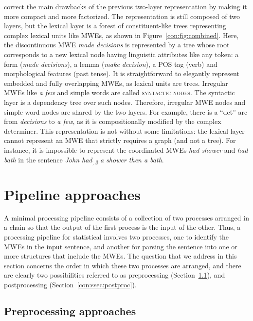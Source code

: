 \documentclass[output=paper]{langsci/langscibook}
\begin{document}
\citet{constantnivre16} correct the main drawbacks of the previous two-layer representation by making it more compact and more factorized. The representation is still composed of two layers, but the lexical layer is a forest of constituent-like trees representing complex lexical units like MWEs, as shown in Figure~\ref{con:fig:combined}.
Here, the discontinuous MWE \textit{made decisions} is represented by a tree whose root corresponds to a new lexical node having linguistic attributes like any token: a form (\textit{made decisions}), a lemma (\textit{make decision}), a POS tag (verb) and morphological features (past tense).
It is straightforward to elegantly represent embedded and fully overlapping MWEs, as lexical units are trees.
Irregular MWEs like \textit{a few} and simple words are called \textsc{syntactic nodes}. The syntactic layer is a dependency tree over such nodes. Therefore, irregular MWE nodes and simple word nodes are shared by the two layers. For example, there is a ``det'' arc from \textit{decisions} to \textit{a few}, as it is compositionally modified by the complex determiner.  This representation is not without some limitations: the lexical layer cannot represent an MWE that strictly requires a graph (and not a tree). For instance, it is impossible to represent the coordinated MWEs \textit{had shower} and \textit{had bath} in the sentence \textit{John had\textsubscript{,\,2} a shower\textsubscript{} then a bath\textsubscript{}}. 

%
\section{Pipeline approaches}
\label{con:sec:pipeline}

A minimal processing pipeline consists of a collection of two processes arranged in a chain so that the output of the first process is the input of the other. Thus, a processing pipeline for statistical  involves two processes, one to identify the MWEs in the input sentence, and another for parsing the sentence into one or more structures that include the MWEs. The question that we address in this section concerns the order in which these two processes are arranged, and there are clearly two possibilities referred to as preprocessing (Section~\ref{con:ssec:preproc}), and postprocessing (Section~\ref{con:ssec:postproc}).

\subsection{Preprocessing approaches}
\label{con:ssec:preproc}
\end{document}
